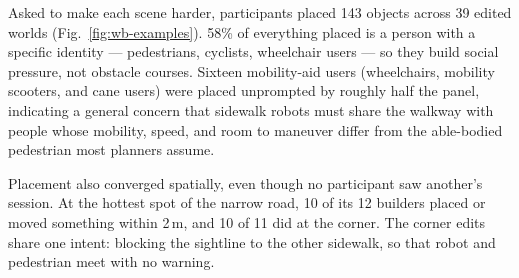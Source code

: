 
Asked to make each scene harder, participants placed 143 objects across 39 edited worlds (Fig.~\ref{fig:wb-examples}). 58\% of everything placed is a person with a specific identity --- pedestrians, cyclists, wheelchair users --- so they build social pressure, not obstacle courses. Sixteen mobility-aid users (wheelchairs, mobility scooters, and cane users) were placed unprompted by roughly half the panel, indicating a general concern that sidewalk robots must share the walkway with people whose mobility, speed, and room to maneuver differ from the able-bodied pedestrian most planners assume.

Placement also converged spatially, even though no participant saw another's session. At the hottest spot of the narrow road, 10 of its 12 builders placed or moved something within 2\,m, and 10 of 11 did at the corner. The corner edits share one intent: blocking the sightline to the other sidewalk, so that robot and pedestrian meet with no warning.

